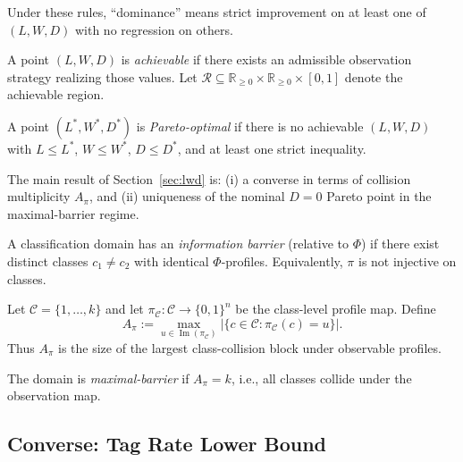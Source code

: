 Under these rules, ``dominance'' means strict improvement on at least one of $(L, W, D)$ with no regression on others.

\begin{definition}
A point $(L, W, D)$ is \emph{achievable} if there exists an admissible observation strategy realizing those values. Let $\mathcal{R} \subseteq \mathbb{R}_{\geq 0} \times \mathbb{R}_{\geq 0} \times [0,1]$ denote the achievable region.
\end{definition}

\begin{definition}
A point $(L^*, W^*, D^*)$ is \emph{Pareto-optimal} if there is no achievable $(L, W, D)$ with $L \leq L^*$, $W \leq W^*$, $D \leq D^*$, and at least one strict inequality.
\end{definition}

The main result of Section~\ref{sec:lwd} is: (i) a converse in terms of collision multiplicity $A_\pi$, and (ii) uniqueness of the nominal $D=0$ Pareto point in the maximal-barrier regime.

\begin{definition}
\label{def:info-barrier-domain}
A classification domain has an \emph{information barrier} (relative to $\Phi$) if there exist distinct classes $c_1 \neq c_2$ with identical $\Phi$-profiles. Equivalently, $\pi$ is not injective on classes.
\end{definition}

\begin{definition}
\label{def:collision-multiplicity}
Let $\mathcal{C}=\{1,\ldots,k\}$ and let $\pi_{\mathcal{C}}:\mathcal{C}\to\{0,1\}^n$ be the class-level profile map. Define
\[
A_\pi := \max_{u \in \operatorname{Im}(\pi_{\mathcal{C}})} \left|\{c \in \mathcal{C} : \pi_{\mathcal{C}}(c)=u\}\right|.
\]
Thus $A_\pi$ is the size of the largest class-collision block under observable profiles.
\end{definition}

\begin{definition}
\label{def:max-barrier}
The domain is \emph{maximal-barrier} if $A_\pi = k$, i.e., all classes collide under the observation map.
\end{definition}

\subsection{Converse: Tag Rate Lower Bound}

